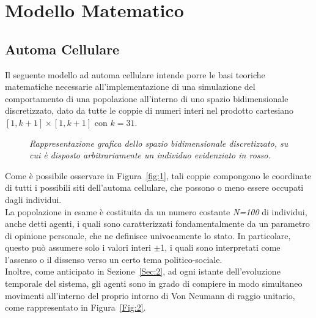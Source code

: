 \documentclass[letterpaper,10pt]{article}
\begin{document}
\section{Modello Matematico}
\label{Sec:3}

\subsection{Automa Cellulare}
\label{Sec:3.1}
Il seguente modello ad automa cellulare \cite{modeling} intende porre le basi teoriche matematiche necessarie all'implementazione di una simulazione del comportamento di una popolazione all’interno di uno spazio bidimensionale discretizzato, dato da tutte le coppie di numeri interi nel prodotto cartesiano $[1,k+1]\times[1,k+1]$ con $k=31$.

\begin{figure}[h]
\centering
{}
\caption{\textit{Rappresentazione grafica dello spazio bidimensionale discretizzato, su cui è disposto arbitrariamente un individuo evidenziato in rosso.}}
\label{Fig:1}
\end{figure}

Come è possibile osservare in Figura~\ref{fig:1}, tali coppie compongono le coordinate di tutti i possibili siti dell'automa cellulare, che possono o meno essere occupati dagli individui.
\\ La popolazione in esame è costituita da un numero costante \textit{N=100} di individui, anche detti agenti, i quali sono caratterizzati fondamentalmente da un parametro di opinione personale, che ne definisce univocamente lo stato.
In particolare, questo può assumere solo i valori interi $\pm$1, i quali sono interpretati come l'assenso o il dissenso verso un certo tema politico-sociale.
\bigskip \bigskip
\\ Inoltre, come anticipato in Sezione~\ref{Sec:2}, ad ogni istante dell’evoluzione temporale del sistema, gli agenti sono in grado di compiere in modo simultaneo movimenti all'interno del proprio intorno di Von Neumann di raggio unitario, come rappresentato in Figura~\ref{Fig:2}.
\end{document}
